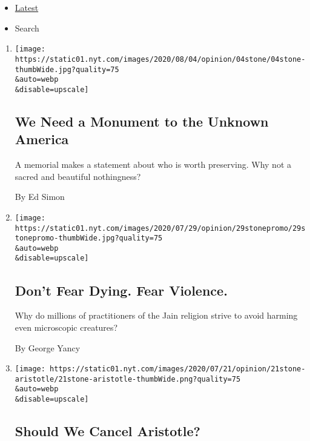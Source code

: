 \begin{itemize}
\tightlist
\item
  \protect\hyperlink{stream-panel}{Latest}
\item
  Search
\end{itemize}

\begin{enumerate}
\def\labelenumi{\arabic{enumi}.}
\item
  \href{/2020/08/04/opinion/us-monuments-rome-unknown-god.html}{}

  \texttt{[image: https://static01.nyt.com/images/2020/08/04/opinion/04stone/04stone-thumbWide.jpg?quality=75\\\&auto=webp\\\&disable=upscale]}

  \hypertarget{we-need-a-monument-to-the-unknown-america}{%
  \subsection{We Need a Monument to the Unknown
  America}\label{we-need-a-monument-to-the-unknown-america}}

  A memorial makes a statement about who is worth preserving. Why not a
  sacred and beautiful nothingness?

  By Ed Simon
\item
  \href{/2020/07/29/opinion/jainism-nonviolence-death.html}{}

  \texttt{[image: https://static01.nyt.com/images/2020/07/29/opinion/29stonepromo/29stonepromo-thumbWide.jpg?quality=75\\\&auto=webp\\\&disable=upscale]}

  \hypertarget{dont-fear-dying-fear-violence}{%
  \subsection{Don't Fear Dying. Fear
  Violence.}\label{dont-fear-dying-fear-violence}}

  Why do millions of practitioners of the Jain religion strive to avoid
  harming even microscopic creatures?

  By George Yancy
\item
  \href{/2020/07/21/opinion/should-we-cancel-aristotle.html}{}

  \texttt{[image: https://static01.nyt.com/images/2020/07/21/opinion/21stone-aristotle/21stone-aristotle-thumbWide.png?quality=75\\\&auto=webp\\\&disable=upscale]}

  \hypertarget{should-we-cancel-aristotle}{%
  \subsection{Should We Cancel
  Aristotle?}\label{should-we-cancel-aristotle}}


\end{enumerate}
